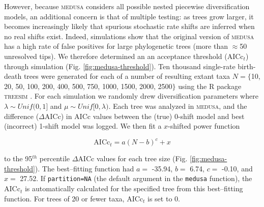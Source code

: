 However, because \textsc{medusa} considers all possible nested piecewise diversification models, an additional concern is that of multiple testing: as trees grow larger, it becomes increasingly likely that spurious stochastic rate shifts are inferred when no real shifts exist. Indeed, simulations show that the original version of \textsc{medusa} has a high rate of false positives for large phylogenetic trees (more than $\approx$50 unresolved tips). We therefore determined an an acceptance threshold (AICc$_t$) through simulation (Fig. \ref{fig:medusa-threshold}). Ten thousand single-rate birth-death trees were generated for each of a number of resulting extant taxa $N = \lbrace$10, 20, 50, 100, 200, 400, 500, 750, 1000, 1500, 2000, 2500$\rbrace$ using the R package \textsc{treesim} \citep{treesim}. For each simulation we randomly drew diversification parameters where $\lambda \sim Unif(0,1]$ and $\mu \sim Unif[0, \lambda)$. Each tree was analyzed in \textsc{medusa}, and the difference ($\Delta$AICc) in AICc values between the (true) 0-shift model and best (incorrect) 1-shift model was logged. We then fit a $x$-shifted power function

\begin{equation}
\mathrm{AICc}_{t} = a (N - b)^{c} + x 
\end{equation}

to the 95$^{th}$ percentile $\Delta$AICc values for each tree size (Fig. \ref{fig:medusa-threshold}). The best--fitting function had $a =$ -35.94, $b =$ 6.74, $c =$ -0.10, and $x =$ 27.52. If \texttt{partition=NA} (the default argument in the \texttt{medusa} function), the AICc$_{t}$ is automatically calculated for the specified tree from this best--fitting function. For trees of 20 or fewer taxa, AICc$_{t}$ is set to 0.

